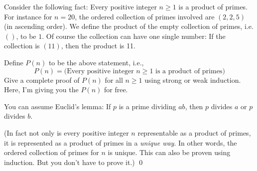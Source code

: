 Consider the following fact:
Every positive integer $n \geq 1$ is a product of primes.
For instance for $n = 20$,
the ordered collection of primes involved are $(2, 2, 5)$ (in ascending order).
We define the product of the empty collection of primes, i.e. $()$, to be $1$.
Of course the collection can have one single number:
If the collection is $(11)$, then the product is 11.

Define $P(n)$ to be the above statement, i.e.,
\[
  P(n) =
  \biggl(
  \text{Every positive integer $n \geq 1$ is a product of primes}
  \biggr)
\]
Give a complete proof of $P(n)$ for all $n \geq 1$
using strong or weak induction.
Here, I'm giving you the $P(n)$ for free.

You can assume Euclid's lemma: If $p$ is a prime dividing $ab$,
then $p$ divides $a$ or $p$ divides $b$.

(In fact not only is every positive integer $n$ representable
as a product of primes,
it is represented as a product of primes in a \textit{unique way}.
In other words, the ordered collection of primes for $n$ is unique.
This can also be proven using induction.
But you don't have to prove it.)
\qed
